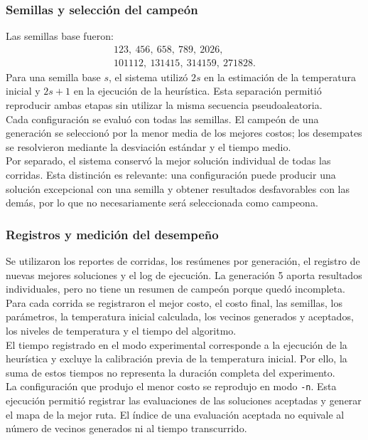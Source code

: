 \documentclass[12pt]{article}
\begin{document}
\subsubsection{Semillas y selección del campeón}

Las semillas base fueron:
\[
\begin{gathered}
123,\ 456,\ 658,\ 789,\ 2026,\\
101112,\ 131415,\ 314159,\ 271828.
\end{gathered}
\]
Para una semilla base $s$, el sistema utilizó $2s$ en la estimación
de la temperatura inicial y $2s+1$ en la ejecución de la heurística.
Esta separación permitió reproducir ambas etapas sin utilizar la
misma secuencia pseudoaleatoria.
\\
Cada configuración se evaluó con todas las semillas. El campeón de
una generación se seleccionó por la menor media de los mejores
costos; los desempates se resolvieron mediante la desviación estándar
y el tiempo medio.
\\
Por separado, el sistema conservó la mejor solución individual de
todas las corridas. Esta distinción es relevante: una configuración
puede producir una solución excepcional con una semilla y obtener
resultados desfavorables con las demás, por lo que no necesariamente
será seleccionada como campeona.

\subsubsection{Registros y medición del desempeño}

Se utilizaron los reportes de corridas, los resúmenes por generación,
el registro de nuevas mejores soluciones y el log de ejecución.
La generación 5 aporta resultados individuales, pero no tiene un
resumen de campeón porque quedó incompleta.
\\
Para cada corrida se registraron el mejor costo, el costo final,
las semillas, los parámetros, la temperatura inicial calculada,
los vecinos generados y aceptados, los niveles de temperatura y
el tiempo del algoritmo.
\\
El tiempo registrado en el modo experimental corresponde a la
ejecución de la heurística y excluye la calibración previa de la
temperatura inicial. Por ello, la suma de estos tiempos no representa
la duración completa del experimento.
\\
La configuración que produjo el menor costo se reprodujo en modo
\texttt{-n}. Esta ejecución permitió registrar las evaluaciones de
las soluciones aceptadas y generar el mapa de la mejor ruta.
El índice de una evaluación aceptada no equivale al número de
vecinos generados ni al tiempo transcurrido.
\end{document}
